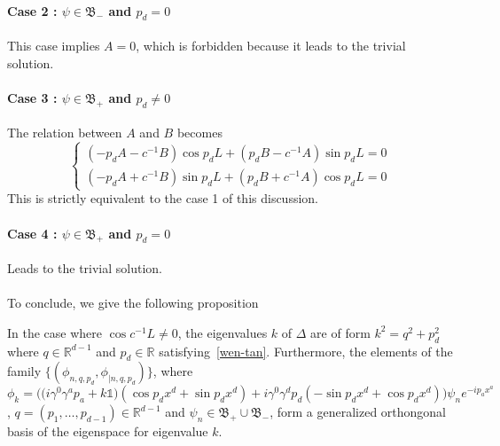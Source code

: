 \paragraph{Case 2 : $\psi \in \mathfrak{B}_-$ and $p_d = 0$}
This case implies $A = 0$, which is forbidden because it leads to the trivial solution.
%
\paragraph{Case 3 : $\psi \in \mathfrak{B}_+$ and $p_d \neq 0$}
The relation between $A$ and $B$ becomes
\begin{equation*}
\begin{cases}
(-p_d A - c^{-1} B)\cos p_d L + (p_d B - c^{-1}A)\sin p_d L = 0  \\
(-p_d A + c^{-1}B)\sin p_d L + (p_d B + c^{-1} A)\cos p_d L = 0 
\end{cases}
\end{equation*}
This is strictly equivalent to the case 1 of this discussion.
%
\paragraph{Case 4 : $\psi \in \mathfrak{B}_+$ and $p_d = 0$}
Leads to the trivial solution. \\\\
To conclude, we give the following proposition
\begin{proposition}
In the case where $\cos c^{-1}L \neq 0$,
the eigenvalues $k$ of $\Delta$ are of form $k^2 = q^2 + p^2_d $ where $q\in\mathbb{R}^{d-1}$ and $p_d\in \mathbb{R}$ satisfying~\cref{wen-tan}.
Furthermore, the elements of the family $\{(\phi_{n,q,p_d}, \phi_{|n,q,p_d})\}$, where
\begin{equation*}
\phi_k = \Big(\big(i\gamma^0\gamma^a p_a+k\mathbb{1}\big)(\cos p_d x^d + \sin p_d x^d) +
i\gamma^0\gamma^d p_d(-\sin p_d x^d + \cos p_d x^d)\Big) \psi_n e^{-ip_a x^a}
\end{equation*}
, $q=(p_1,\ldots, p_{d-1})\in\mathbb{R}^{d-1}$ and $\psi_n\in\mathfrak{B}_+\cup\mathfrak{B}_-$,
form a generalized orthongonal basis of the eigenspace for eigenvalue $k$.
\end{proposition}



